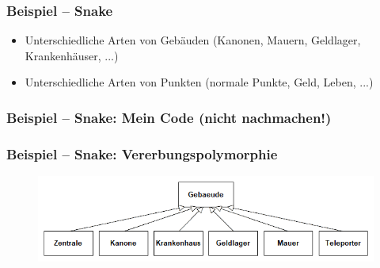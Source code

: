{
\begin{frame}
	\frametitle{Beispiel -- Snake}
	\begin{itemize}
		\item Unterschiedliche Arten von Gebäuden (Kanonen, Mauern, Geldlager, Krankenhäuser, ...)
		\item Unterschiedliche Arten von Punkten (normale Punkte, Geld, Leben, ...)
	\end{itemize}
\end{frame}
}

{
\begin{frame}[t]
	\frametitle{Beispiel -- Snake: Mein Code (nicht nachmachen!)}
	{\tiny\UseRawInputEncoding{}}
\end{frame}
}

{
\begin{frame}[t]
	\frametitle{Beispiel -- Snake: Vererbungspolymorphie}
	\begin{figure}[H]
		\includegraphics[width=\textwidth]{polymorphie/universell/vererbung/beispiele/snake/gebaeude.png}
	\end{figure}
	{\tiny\UseRawInputEncoding{}}
\end{frame}
}

